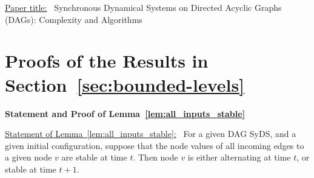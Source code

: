 
\appendix

\onecolumn

\begin{center}
\end{center}

\bigskip

\noindent
\underline{Paper title:}~
Synchronous Dynamical Systems on Directed Acyclic Graphs (DAGs): 
Complexity and Algorithms

\bigskip


\noindent
\section{Proofs of the Results in Section~\ref{sec:bounded-levels}}

\medskip

\iffalse
\noindent
\textbf{Statement and Proof of Proposition~\ref{pro:long_phase_space_cycle}}

\medskip

\underline{Statement of Proposition~\ref{pro:long_phase_space_cycle}:}~
For every $n  > 1$, there is an $n$ node DAG SyDS
whose phase space graph is a cycle of length $2^n$.

\medskip

\noindent
\textbf{Proof:}~
For a given $n > 1$ we construct the DAG SyDS $S_n$ to be a counter,
as follows.  The underlying graph contains $n$ levels, one node per
level.  For each node, there is an incoming edge from the nodes on
each of the lower levels.  The transition function for each node
is the function that retains the current value of the node if any
of the lower order bits is 0, and changes the value of the node if
all of the lower order bits are 1.

Suppose a given configuration of $S_n$ is interpreted as encoding
an integer $k$, $0 \leq k < 2^n$.  Then the successor configuration
encodes the integer $k + 1 \mod 2^n$.  Thus, the phase space of
$S_n$ is a cycle of length $2^n$.  \QED
\fi


\noindent
\textbf{Statement and Proof of Lemma~\ref{lem:all_inputs_stable}}

\medskip

\noindent
\underline{Statement of Lemma~\ref{lem:all_inputs_stable}:}~
For a given DAG SyDS, and a given initial configuration, suppose
that the node values of all incoming edges to a given node $v$ are
stable at time $t$.  Then node $v$ is either alternating at time
$t$, or stable at time $t+1$.

